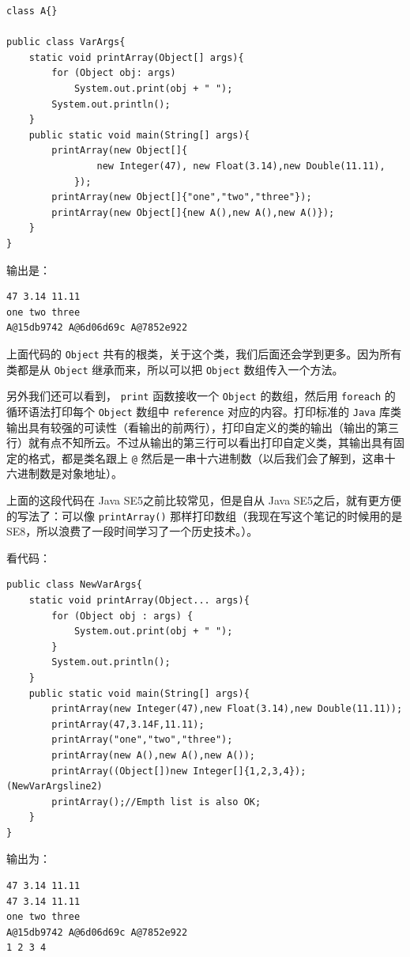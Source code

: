 \documentclass[10pt,a4paper,UTF8]{article}
\begin{document}
\lstset{language=C,label= ,caption= ,captionpos=b,firstnumber=1,numbers=left}
\begin{lstlisting}
class A{}

public class VarArgs{
    static void printArray(Object[] args){
        for (Object obj: args)
            System.out.print(obj + " ");
        System.out.println();
    }
    public static void main(String[] args){
        printArray(new Object[]{
                new Integer(47), new Float(3.14),new Double(11.11),
            });
        printArray(new Object[]{"one","two","three"});
        printArray(new Object[]{new A(),new A(),new A()});
    }
}
\end{lstlisting}
输出是：
\begin{verbatim}
47 3.14 11.11 
one two three 
A@15db9742 A@6d06d69c A@7852e922
\end{verbatim}
上面代码的 \texttt{Object} 共有的根类，关于这个类，我们后面还会学到更多。因为所有类都是从 \texttt{Object} 继承而来，所以可以把 \texttt{Object} 数组传入一个方法。

另外我们还可以看到， \texttt{print} 函数接收一个 \texttt{Object} 的数组，然后用 \texttt{foreach} 的循环语法打印每个 \texttt{Object} 数组中 \texttt{reference} 对应的内容。打印标准的 \texttt{Java} 库类输出具有较强的可读性（看输出的前两行），打印自定义的类的输出（输出的第三行）就有点不知所云。不过从输出的第三行可以看出打印自定义类，其输出具有固定的格式，都是类名跟上 \texttt{@} 然后是一串十六进制数（以后我们会了解到，这串十六进制数是对象地址）。

上面的这段代码在 Java SE5之前比较常见，但是自从 Java SE5之后，就有更方便的写法了：可以像  \texttt{printArray()} 那样打印数组（我现在写这个笔记的时候用的是SE8，所以浪费了一段时间学习了一个历史技术。）。

看代码：
\lstset{language=C,label= ,caption= ,captionpos=b,firstnumber=1,numbers=left}
\begin{lstlisting}
public class NewVarArgs{
    static void printArray(Object... args){
        for (Object obj : args) {
            System.out.print(obj + " ");
        }
        System.out.println();
    }
    public static void main(String[] args){
        printArray(new Integer(47),new Float(3.14),new Double(11.11));
        printArray(47,3.14F,11.11); 
        printArray("one","two","three");
        printArray(new A(),new A(),new A());
        printArray((Object[])new Integer[]{1,2,3,4});                       (NewVarArgsline2)
        printArray();//Empth list is also OK;
    }
}
\end{lstlisting}
输出为：
\begin{verbatim}
47 3.14 11.11 
47 3.14 11.11 
one two three 
A@15db9742 A@6d06d69c A@7852e922 
1 2 3 4
\end{verbatim}
\end{document}
